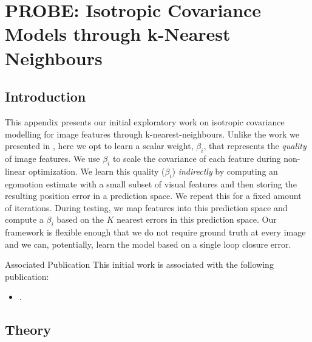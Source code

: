 \chapter{PROBE: Isotropic Covariance Models through k-Nearest Neighbours}
\label{app:appendix_probe_knn}

\section{Introduction}

This appendix presents our initial exploratory work on isotropic covariance modelling for image features through k-nearest-neighbours. 
Unlike the work we presented in , here we opt to learn a scalar weight, $\beta_i$, that represents the \textit{quality} of image features. We use $\beta_i$ to scale the covariance of each feature during non-linear optimization. 
We learn this quality ($\beta_i$) \textit{indirectly} by computing an egomotion estimate with a small subset of visual features and then storing the resulting position error in a prediction space. We repeat this for a fixed amount of iterations. During testing, we map features into this prediction space and compute a $\beta_i$ based on the $K$ nearest errors in this prediction space. Our framework is flexible enough that we do not require ground truth at every image and we can, potentially, learn the model based on a single loop closure error. 

\begin{remark}{Associated Publication}
This initial work is associated with the following publication:
\begin{itemize}
\item {}.	
\end{itemize}
\end{remark}

\section{Theory}

